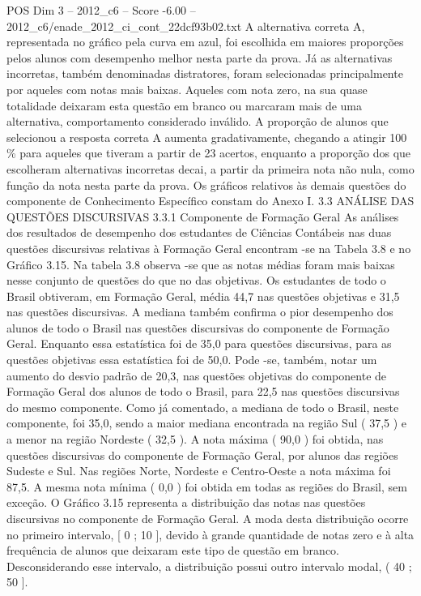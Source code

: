 \begin{textsample}{POS Dim 3 – 2012\_c6 – Score -6.00 – 2012\_c6/enade\_2012\_ci\_cont\_22dcf93b02.txt}
A alternativa correta A, representada no gráfico pela curva em azul, foi escolhida em maiores proporções pelos alunos com desempenho melhor nesta parte da prova.
Já as alternativas incorretas, também denominadas distratores, foram selecionadas principalmente por aqueles com notas mais baixas.
Aqueles com nota zero, na sua quase totalidade deixaram esta questão em branco ou marcaram mais de uma alternativa, comportamento considerado inválido.
A proporção de alunos que selecionou a resposta correta A aumenta gradativamente, chegando a atingir 100 \% para aqueles que tiveram a partir de 23 acertos, enquanto a proporção dos que escolheram alternativas incorretas decai, a partir da primeira nota não nula, como função da nota nesta parte da prova.
Os gráficos relativos às demais questões do componente de Conhecimento Específico constam do Anexo I. 3.3 ANÁLISE DAS QUESTÕES DISCURSIVAS 3.3.1 Componente de Formação Geral As análises dos resultados de desempenho dos estudantes de Ciências Contábeis nas duas questões discursivas relativas à Formação Geral encontram -se na Tabela 3.8 e no Gráfico 3.15.
Na tabela 3.8 observa -se que as notas médias foram mais baixas nesse conjunto de questões do que no das objetivas.
Os estudantes de todo o Brasil obtiveram, em Formação Geral, média 44,7 nas questões objetivas e 31,5 nas questões discursivas.
A mediana também confirma o pior desempenho dos alunos de todo o Brasil nas questões discursivas do componente de Formação Geral.
Enquanto essa estatística foi de 35,0 para questões discursivas, para as questões objetivas essa estatística foi de 50,0.
Pode -se, também, notar um aumento do desvio padrão de 20,3, nas questões objetivas do componente de Formação Geral dos alunos de todo o Brasil, para 22,5 nas questões discursivas do mesmo componente.
Como já comentado, a mediana de todo o Brasil, neste componente, foi 35,0, sendo a maior mediana encontrada na região Sul ( 37,5 ) e a menor na região Nordeste ( 32,5 ).
A nota máxima ( 90,0 ) foi obtida, nas questões discursivas do componente de Formação Geral, por alunos das regiões Sudeste e Sul.
Nas regiões Norte, Nordeste e Centro-Oeste a nota máxima foi 87,5.
A mesma nota mínima ( 0,0 ) foi obtida em todas as regiões do Brasil, sem exceção.
O Gráfico 3.15 representa a distribuição das notas nas questões discursivas no componente de Formação Geral.
A moda desta distribuição ocorre no primeiro intervalo, [ 0 ; 10 ], devido à grande quantidade de notas zero e à alta frequência de alunos que deixaram este tipo de questão em branco.
Desconsiderando esse intervalo, a distribuição possui outro intervalo modal, ( 40 ; 50 ].

\end{textsample}
